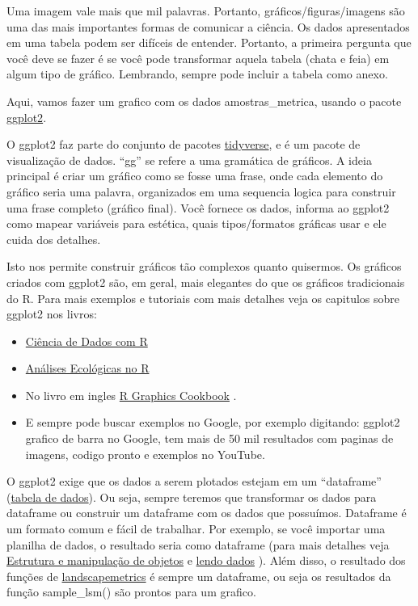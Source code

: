 \documentclass[
]{article}
\begin{document}
Uma imagem vale mais que mil palavras. Portanto, gráficos/figuras/imagens são uma das mais importantes formas de comunicar a ciência. Os dados apresentados em uma tabela podem ser difíceis de entender. Portanto, a primeira pergunta que você deve se fazer é se você pode transformar aquela tabela (chata e feia) em algum tipo de gráfico. Lembrando, sempre pode incluir a tabela como anexo.

Aqui, vamos fazer um grafico com os dados amostras\_metrica,
usando o pacote \href{https://ggplot2.tidyverse.org/index.html}{ggplot2}.

O ggplot2 faz parte do conjunto de pacotes \href{https://tidyverse.tidyverse.org/articles/paper.html}{tidyverse}, e é um pacote de visualização de dados. ``gg'' se refere a uma gramática de gráficos. A ideia principal é criar um gráfico como se fosse uma frase, onde cada elemento do gráfico seria uma palavra, organizados em uma sequencia logica para construir uma frase completo (gráfico final). Você fornece os dados, informa ao ggplot2 como mapear variáveis para estética, quais tipos/formatos gráficas usar e ele cuida dos detalhes.

Isto nos permite construir gráficos tão complexos quanto quisermos. Os gráficos criados com ggplot2 são, em geral, mais elegantes do que os gráficos tradicionais do R. Para mais exemplos e tutoriais com mais detalhes veja os capitulos sobre ggplot2 nos livros:

\begin{itemize}
\item
  \href{http://sillasgonzaga.com/material/cdr/ggplot2.html}{Ciência de Dados com R}\\
\item
  \href{https://analises-ecologicas.com/cap6.html}{Análises Ecológicas no R}
\item
  No livro em ingles \href{https://r-graphics.org/}{R Graphics Cookbook} .
\item
  E sempre pode buscar exemplos no Google, por exemplo digitando: ggplot2 grafico de barra no Google, tem mais de 50 mil resultados com paginas de imagens, codigo pronto e exemplos no YouTube.
\end{itemize}

O ggplot2 exige que os dados a serem plotados estejam em um ``dataframe'' (\href{https://bookdown.org/wevsena/curso_r_tce/curso_r_tce.html\#data-frames-e-tibbles}{tabela de dados}). Ou seja, sempre teremos que transformar os dados para dataframe ou construir um dataframe com os dados que possuímos. Dataframe é um formato comum e fácil de trabalhar. Por exemplo, se você importar uma planilha de dados, o resultado seria como dataframe (para mais detalhes veja \href{https://analises-ecologicas.com/cap4.html\#estrutura-e-manipula\%C3\%A7\%C3\%A3o-de-objetos}{Estrutura e manipulação de objetos} e \href{http://sillasgonzaga.com/material/cdr/lendo-os-dados.html}{lendo dados} ). Além disso, o resultado dos funções de \href{https://r-spatialecology.github.io/landscapemetrics/}{landscapemetrics} é sempre um dataframe, ou seja os resultados da função \colorbox[HTML]{dedede}{sample\_lsm()} são prontos para um grafico.
\end{document}
